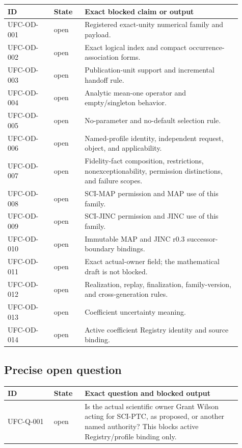 \begin{longtable}{p{0.18\linewidth}p{0.12\linewidth}p{0.61\linewidth}}
\toprule
ID & State & Exact blocked claim or output\\
\midrule
\endhead
UFC-OD-001 & open & Registered exact-unity numerical family and payload.\\
UFC-OD-002 & open & Exact logical index and compact occurrence-association
forms.\\
UFC-OD-003 & open & Publication-unit support and incremental handoff rule.\\
UFC-OD-004 & open & Analytic mean-one operator and empty/singleton behavior.\\
UFC-OD-005 & open & No-parameter and no-default selection rule.\\
UFC-OD-006 & open & Named-profile identity, independent request, object, and
applicability.\\
UFC-OD-007 & open & Fidelity-fact composition, restrictions,
nonexceptionability, permission distinctions, and failure scopes.\\
UFC-OD-008 & open & SCI-MAP permission and MAP use of this family.\\
UFC-OD-009 & open & SCI-JINC permission and JINC use of this family.\\
UFC-OD-010 & open & Immutable MAP and JINC r0.3 successor-boundary
bindings.\\
UFC-OD-011 & open & Exact actual-owner field; the mathematical draft is not
blocked.\\
UFC-OD-012 & open & Realization, replay, finalization, family-version, and
cross-generation rules.\\
UFC-OD-013 & open & Coefficient uncertainty meaning.\\
UFC-OD-014 & open & Active coefficient Registry identity and source binding.\\
\bottomrule
\end{longtable}

\subsection*{Precise open question}

\begin{center}
\begin{tabular}{p{0.18\linewidth}p{0.12\linewidth}p{0.61\linewidth}}
\toprule
ID & State & Exact question and blocked output\\
\midrule
UFC-Q-001 & open & Is the actual scientific owner Grant Wilson acting for
SCI-PTC, as proposed, or another named authority? This blocks active
Registry/profile binding only.\\
\bottomrule
\end{tabular}
\end{center}

\fi
